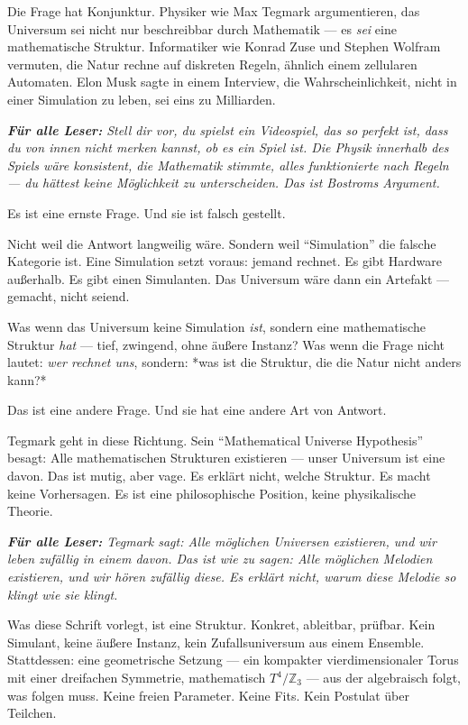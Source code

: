 \documentclass[11pt,oneside]{book}
\newenvironment{laierspur}{%
  \par\vspace{4pt}%
  \noindent\small\itshape\color{blue!60!black}%
  \textbf{Für alle Leser:}\enspace\ignorespaces}{%
  \par\vspace{4pt}\normalsize\normalfont\normalcolor}
\begin{document}
Die Frage hat Konjunktur. Physiker wie Max Tegmark argumentieren, das
Universum sei nicht nur beschreibbar durch Mathematik — es \textit{sei} eine
mathematische Struktur. Informatiker wie Konrad Zuse und Stephen Wolfram
vermuten, die Natur rechne auf diskreten Regeln, ähnlich einem zellularen
Automaten. Elon Musk sagte in einem Interview, die Wahrscheinlichkeit, nicht
in einer Simulation zu leben, sei eins zu Milliarden.


\begin{laierspur}
Stell dir vor, du spielst ein Videospiel, das so perfekt ist,
dass du von innen nicht merken kannst, ob es ein Spiel ist. Die Physik
innerhalb des Spiels wäre konsistent, die Mathematik stimmte, alles
funktionierte nach Regeln — du hättest keine Möglichkeit zu unterscheiden.
Das ist Bostroms Argument.
\end{laierspur}

Es ist eine ernste Frage. Und sie ist falsch gestellt.


Nicht weil die Antwort langweilig wäre. Sondern weil \enquote{Simulation} die
falsche Kategorie ist. Eine Simulation setzt voraus: jemand rechnet. Es gibt
Hardware außerhalb. Es gibt einen Simulanten. Das Universum wäre dann ein
Artefakt — gemacht, nicht seiend.


Was wenn das Universum keine Simulation \textit{ist}, sondern eine mathematische
Struktur \textit{hat} — tief, zwingend, ohne äußere Instanz? Was wenn die Frage
nicht lautet: \textit{wer rechnet uns}, sondern: *was ist die Struktur, die die
Natur nicht anders kann?*


Das ist eine andere Frage. Und sie hat eine andere Art von Antwort.


Tegmark geht in diese Richtung. Sein \enquote{Mathematical Universe Hypothesis}
besagt: Alle mathematischen Strukturen existieren — unser Universum ist eine
davon. Das ist mutig, aber vage. Es erklärt nicht, welche Struktur. Es macht
keine Vorhersagen. Es ist eine philosophische Position, keine physikalische
Theorie.


\begin{laierspur}
Tegmark sagt: Alle möglichen Universen existieren, und wir
leben zufällig in einem davon. Das ist wie zu sagen: Alle möglichen
Melodien existieren, und wir hören zufällig diese. Es erklärt nicht,
warum diese Melodie so klingt wie sie klingt.
\end{laierspur}

Was diese Schrift vorlegt, ist eine Struktur. Konkret, ableitbar, prüfbar.
Kein Simulant, keine äußere Instanz, kein Zufallsuniversum aus einem
Ensemble. Stattdessen: eine geometrische Setzung — ein kompakter
vierdimensionaler Torus mit einer dreifachen Symmetrie, mathematisch $T^4/\mathbb{Z}_3$
— aus der algebraisch folgt, was folgen muss. Keine freien Parameter. Keine
Fits. Kein Postulat über Teilchen.
\end{document}
